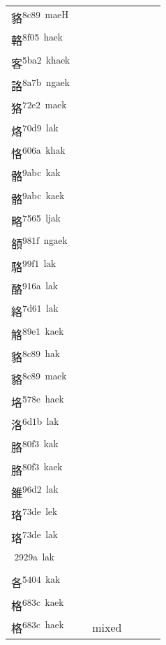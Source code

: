 \documentclass[14pt,a4paper]{scrartcl}
\begin{document}
\begin{longtable}[c]{@{}llllll@{}}
\begin{minipage}[t]{0.14\columnwidth}
貉\textsuperscript{8c89~maeH}
\strut\end{minipage} &
\begin{minipage}[t]{0.14\columnwidth}\raggedright\strut
閣\textsuperscript{95a3~kak}\\
輅\textsuperscript{8f05~haek}\\
客\textsuperscript{5ba2~khaek}\\
詻\textsuperscript{8a7b~ngaek}\\
狢\textsuperscript{72e2~maek}\\
烙\textsuperscript{70d9~lak}\\
恪\textsuperscript{606a~khak}\\
骼\textsuperscript{9abc~kak}\\
骼\textsuperscript{9abc~kaek}\\
略\textsuperscript{7565~ljak}\\
頟\textsuperscript{981f~ngaek}\\
駱\textsuperscript{99f1~lak}\\
酪\textsuperscript{916a~lak}\\
絡\textsuperscript{7d61~lak}\\
觡\textsuperscript{89e1~kaek}\\
貉\textsuperscript{8c89~hak}\\
貉\textsuperscript{8c89~maek}\\
垎\textsuperscript{578e~haek}\\
洛\textsuperscript{6d1b~lak}\\
胳\textsuperscript{80f3~kak}\\
胳\textsuperscript{80f3~kaek}\\
雒\textsuperscript{96d2~lak}\\
珞\textsuperscript{73de~lek}\\
珞\textsuperscript{73de~lak}\\
𩊚\textsuperscript{2929a~lak}\\
各\textsuperscript{5404~kak}\\
格\textsuperscript{683c~kaek}\\
格\textsuperscript{683c~haek}
\strut\end{minipage} &
\begin{minipage}[t]{0.14\columnwidth}\raggedright\strut
\strut\end{minipage} &
\begin{minipage}[t]{0.14\columnwidth}\raggedright\strut
mixed
\strut\end{minipage}\tabularnewline
\bottomrule
\end{longtable}
\end{document}
